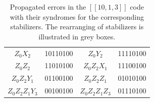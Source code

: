 \documentclass[reprint, amsmath,amssymb, aps,pra,
 floatfix,
]{revtex4-2}
\newcommand{\PadCellColor}[2]{\cellcolor{#1}\kern8pt#2\kern8pt}
\begin{document}
\begin{table}[ht]
\begin{tabular}{|c|c|c|c|}
    
\rowcolor{gray!20}
    \multicolumn{4}{|c|}{\boldmath\textbf{$Z_0Z_1 Z_2 X_3Z_6$} $\longrightarrow$ $Z_0Z_2Z_1X_3Z_6$} \\ \hline

   $Z_0X_2$  & 10110100  & $Z_0Y_2$    &  11110100      \\ \hline
   $Z_0Z_2$  & 11010100  & $Z_0Z_2X_1$    &  11100100      \\ \hline
   $Z_0Z_2Y_1$  & 01100100  & $Z_0Z_2Z_1$    &  01010100      \\ \hline
   $Z_0Z_2Z_1Y_3$  & 00100100  & $Z_0Z_2Z_1Z_3$    &  01110100      \\ \hline

  \end{tabular}
\caption{Propagated errors in the $[[10,1,3]]$ code with their syndromes for the corresponding stabilizers.
The rearranging of stabilizers is illustrated in grey boxes. 
}
\label{tab:errors_due_to_faults_10_2}
\end{table}
\end{document}
